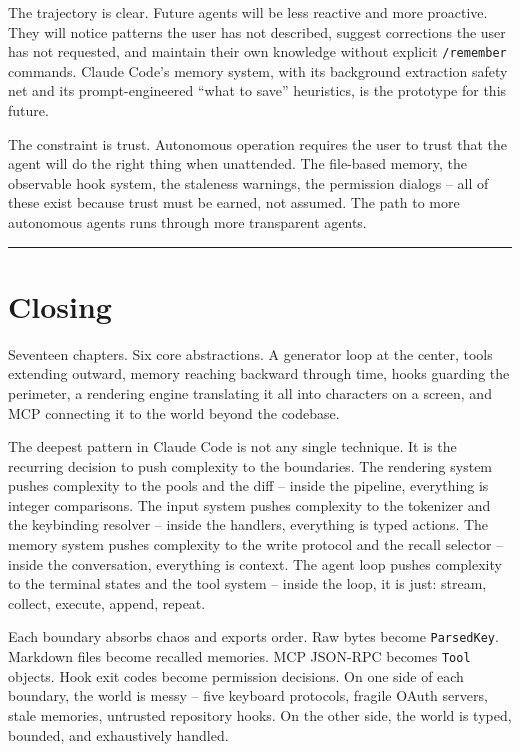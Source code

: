 \documentclass[
  english,
  11pt,
  letterpaper,
]{book}
\begin{document}
The trajectory is clear. Future agents will be less reactive and more
proactive. They will notice patterns the user has not described, suggest
corrections the user has not requested, and maintain their own knowledge
without explicit \texttt{/remember} commands. Claude Code's memory
system, with its background extraction safety net and its
prompt-engineered ``what to save'' heuristics, is the prototype for this
future.

The constraint is trust. Autonomous operation requires the user to trust
that the agent will do the right thing when unattended. The file-based
memory, the observable hook system, the staleness warnings, the
permission dialogs -- all of these exist because trust must be earned,
not assumed. The path to more autonomous agents runs through more
transparent agents.

\begin{center}\rule{0.5\linewidth}{0.5pt}\end{center}

\section{Closing}\label{closing}

Seventeen chapters. Six core abstractions. A generator loop at the
center, tools extending outward, memory reaching backward through time,
hooks guarding the perimeter, a rendering engine translating it all into
characters on a screen, and MCP connecting it to the world beyond the
codebase.

The deepest pattern in Claude Code is not any single technique. It is
the recurring decision to push complexity to the boundaries. The
rendering system pushes complexity to the pools and the diff -- inside
the pipeline, everything is integer comparisons. The input system pushes
complexity to the tokenizer and the keybinding resolver -- inside the
handlers, everything is typed actions. The memory system pushes
complexity to the write protocol and the recall selector -- inside the
conversation, everything is context. The agent loop pushes complexity to
the terminal states and the tool system -- inside the loop, it is just:
stream, collect, execute, append, repeat.

Each boundary absorbs chaos and exports order. Raw bytes become
\texttt{ParsedKey}. Markdown files become recalled memories. MCP
JSON-RPC becomes \texttt{Tool} objects. Hook exit codes become
permission decisions. On one side of each boundary, the world is messy
-- five keyboard protocols, fragile OAuth servers, stale memories,
untrusted repository hooks. On the other side, the world is typed,
bounded, and exhaustively handled.
\end{document}
